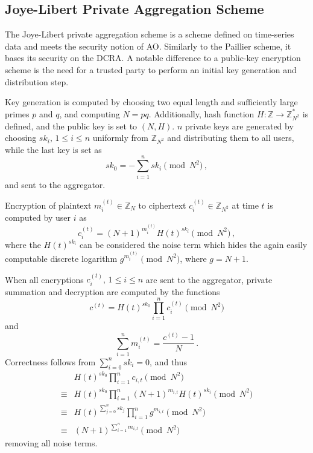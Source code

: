 \documentclass[twocolumn]{autart}
\begin{document}
% 
% 

\subsection{Joye-Libert Private Aggregation Scheme} \label{subsec:joye_libert_scheme}
The Joye-Libert private aggregation scheme \cite{joyeScalableSchemePrivacyPreserving2013} is a scheme defined on time-series data and meets the security notion of AO. Similarly to the Paillier scheme, it bases its security on the DCRA. A notable difference to a public-key encryption scheme is the need for a trusted party to perform an initial key generation and distribution step.

Key generation is computed by choosing two equal length and sufficiently large primes $p$ and $q$, and computing $N=pq$. Additionally, hash function $H:\mathbb{Z} \rightarrow \mathbb{Z}_{N^2}^*$ is defined, and the public key is set to $(N, H)$. $n$ private keys are generated by choosing $sk_i,\,1\leq i\leq n$ uniformly from $\mathbb{Z}_{N^2}$ and distributing them to all users, while the last key is set as
\begin{equation*}
    sk_0 = -\sum^{n}_{i=1}sk_i \pmod{N^2}\,,
\end{equation*}
and sent to the aggregator.

Encryption of plaintext $m^{(t)}_{i} \in \mathbb{Z}_N$ to ciphertext $c^{(t)}_{i} \in \mathbb{Z}_{N^2}$ at time $t$ is computed by user $i$ as
\begin{equation}
    c^{(t)}_{i} = (N+1)^{m^{(t)}_{i}} H(t)^{sk_i} \pmod{N^2}\,,
\end{equation}
where the $H(t)^{sk_i}$ can be considered the noise term which hides the again easily computable discrete logarithm $g^{m^{(t)}_{i}} \pmod{N^2}$, where $g=N+1$.

When all encryptions $c^{(t)}_{i},\,1\leq i \leq n$ are sent to the aggregator, private summation and decryption are computed by the functions
\begin{equation}
    c^{(t)} = H(t)^{sk_0}\prod^{n}_{i=1}c^{(t)}_{i} \pmod{N^2}
\end{equation}
and
\begin{equation}
    \sum^{n}_{i=1}m^{(t)}_{i} = \frac{c^{(t)}-1}{N}\,. \label{eqn:agg_decryption}
\end{equation}
Correctness follows from $\sum^{n}_{i=0}sk_i = 0$, and thus
\begin{equation*}
    \begin{split}
        &H(t)^{sk_0}\prod^{n}_{i=1}c_{i,t} \pmod{N^2} \\
        \equiv &H(t)^{sk_0}\prod^{n}_{i=1}(N+1)^{m_{i,t}} H(t)^{sk_i} \pmod{N^2} \\
        \equiv &H(t)^{\sum^n_{j=0}sk_j} \prod^{n}_{i=1}g^{m_{i,t}} \pmod{N^2} \\
        \equiv &(N+1)^{\sum^n_{i=1}m_{i,t}} \pmod{N^2}
    \end{split}
\end{equation*}
removing all noise terms.
\end{document}
